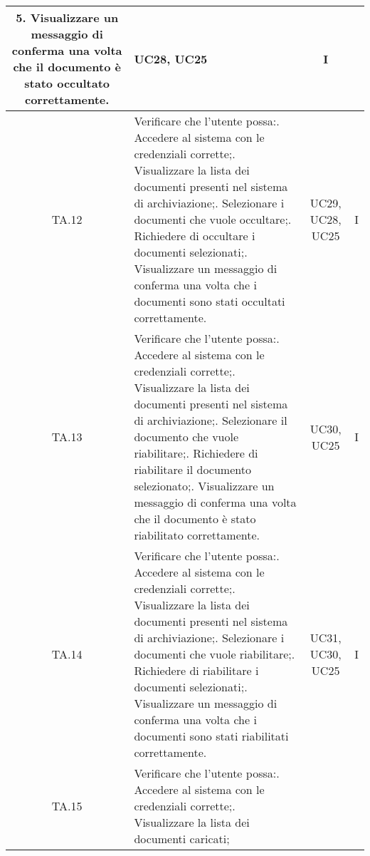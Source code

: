 {{{{{{{{\begin{xltabular}{\textwidth}{|c|X|c|c|}
    5. Visualizzare un messaggio di conferma una volta che il documento è stato occultato correttamente. & UC28, UC25 & I \\
    \hline
    TA.12 & Verificare che l'utente possa:. Accedere al sistema con le credenziali corrette;. Visualizzare la lista dei documenti presenti nel sistema di archiviazione;. Selezionare i documenti che vuole occultare;. Richiedere di occultare i documenti selezionati;. Visualizzare un messaggio di conferma una volta che i documenti sono stati occultati correttamente. & UC29, UC28, UC25 & I \\
    \hline
    TA.13 & Verificare che l'utente possa:. Accedere al sistema con le credenziali corrette;. Visualizzare la lista dei documenti presenti nel sistema di archiviazione;. Selezionare il documento che vuole riabilitare;. Richiedere di riabilitare il documento selezionato;. Visualizzare un messaggio di conferma una volta che il documento è stato riabilitato correttamente. & UC30, UC25 & I \\
    \hline
    TA.14 & Verificare che l'utente possa:. Accedere al sistema con le credenziali corrette;. Visualizzare la lista dei documenti presenti nel sistema di archiviazione;. Selezionare i documenti che vuole riabilitare;. Richiedere di riabilitare i documenti selezionati;. Visualizzare un messaggio di conferma una volta che i documenti sono stati riabilitati correttamente. & UC31, UC30, UC25 & I \\
    \hline
    TA.15 & Verificare che l'utente possa:. Accedere al sistema con le credenziali corrette;. Visualizzare la lista dei documenti caricati;\newline

\end{xltabular}}}}}}}}}
